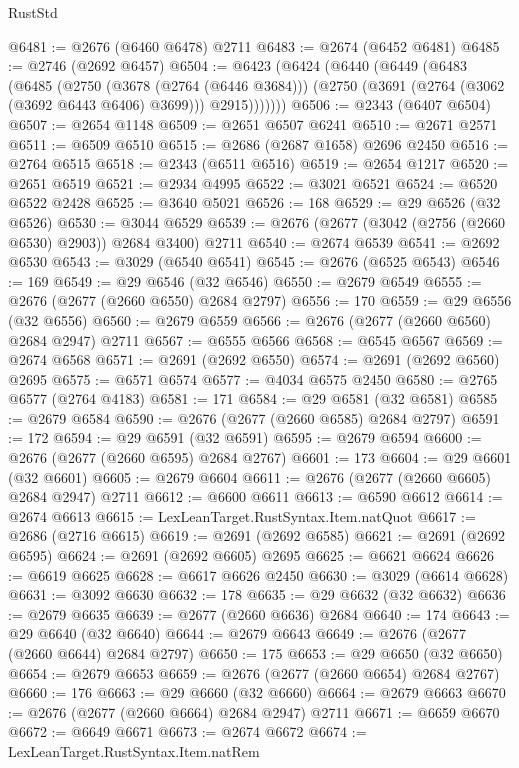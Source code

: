 \begin{lexlean}{RustStd}
\begin{coremodule}
@6481 := @2676 (@6460 @6478) @2711
@6483 := @2674 (@6452 @6481)
@6485 := @2746 (@2692 @6457)
@6504 := @6423
    (@6424
      (@6440
        (@6449
          (@6483
            (@6485
              (@2750
                (@3678 (@2764 (@6446 @3684)))
                (@2750 (@3691 (@2764 (@3062 (@3692 @6443 @6406) @3699))) @2915)))))))
@6506 := @2343 (@6407 @6504)
@6507 := @2654 @1148
@6509 := @2651 @6507 @6241
@6510 := @2671 @2571
@6511 := @6509 @6510
@6515 := @2686 (@2687 @1658) @2696 @2450
@6516 := @2764 @6515
@6518 := @2343 (@6511 @6516)
@6519 := @2654 @1217
@6520 := @2651 @6519
@6521 := @2934 @4995
@6522 := @3021 @6521
@6524 := @6520 @6522 @2428
@6525 := @3640 @5021
@6526 := 168
@6529 := @29 @6526 (@32 @6526)
@6530 := @3044 @6529
@6539 := @2676 (@2677 (@3042 (@2756 (@2660 @6530) @2903)) @2684 @3400) @2711
@6540 := @2674 @6539
@6541 := @2692 @6530
@6543 := @3029 (@6540 @6541)
@6545 := @2676 (@6525 @6543)
@6546 := 169
@6549 := @29 @6546 (@32 @6546)
@6550 := @2679 @6549
@6555 := @2676 (@2677 (@2660 @6550) @2684 @2797)
@6556 := 170
@6559 := @29 @6556 (@32 @6556)
@6560 := @2679 @6559
@6566 := @2676 (@2677 (@2660 @6560) @2684 @2947) @2711
@6567 := @6555 @6566
@6568 := @6545 @6567
@6569 := @2674 @6568
@6571 := @2691 (@2692 @6550)
@6574 := @2691 (@2692 @6560) @2695
@6575 := @6571 @6574
@6577 := @4034 @6575 @2450
@6580 := @2765 @6577 (@2764 @4183)
@6581 := 171
@6584 := @29 @6581 (@32 @6581)
@6585 := @2679 @6584
@6590 := @2676 (@2677 (@2660 @6585) @2684 @2797)
@6591 := 172
@6594 := @29 @6591 (@32 @6591)
@6595 := @2679 @6594
@6600 := @2676 (@2677 (@2660 @6595) @2684 @2767)
@6601 := 173
@6604 := @29 @6601 (@32 @6601)
@6605 := @2679 @6604
@6611 := @2676 (@2677 (@2660 @6605) @2684 @2947) @2711
@6612 := @6600 @6611
@6613 := @6590 @6612
@6614 := @2674 @6613
@6615 := LexLeanTarget.RustSyntax.Item.natQuot
@6617 := @2686 (@2716 @6615)
@6619 := @2691 (@2692 @6585)
@6621 := @2691 (@2692 @6595)
@6624 := @2691 (@2692 @6605) @2695
@6625 := @6621 @6624
@6626 := @6619 @6625
@6628 := @6617 @6626 @2450
@6630 := @3029 (@6614 @6628)
@6631 := @3092 @6630
@6632 := 178
@6635 := @29 @6632 (@32 @6632)
@6636 := @2679 @6635
@6639 := @2677 (@2660 @6636) @2684
@6640 := 174
@6643 := @29 @6640 (@32 @6640)
@6644 := @2679 @6643
@6649 := @2676 (@2677 (@2660 @6644) @2684 @2797)
@6650 := 175
@6653 := @29 @6650 (@32 @6650)
@6654 := @2679 @6653
@6659 := @2676 (@2677 (@2660 @6654) @2684 @2767)
@6660 := 176
@6663 := @29 @6660 (@32 @6660)
@6664 := @2679 @6663
@6670 := @2676 (@2677 (@2660 @6664) @2684 @2947) @2711
@6671 := @6659 @6670
@6672 := @6649 @6671
@6673 := @2674 @6672
@6674 := LexLeanTarget.RustSyntax.Item.natRem

\end{coremodule}
\end{lexlean}
